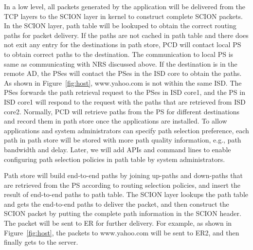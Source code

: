 In a low level, all packets generated by the application will be
delivered from the TCP layers to the SCION layer in kernel to
construct complete SCION packets. In the SCION layer, path table
will be lookuped to obtain the correct routing paths for packet
delivery. If the paths are not cached in path table and there does
not exit any entry for the destinations in path store, PCD will
contact local PS to obtain correct paths to the destination. The
communication to local PS is same as communicating with NRS
discussed above. If the destination is in the remote AD, the PSes
will contact the PSes in the ISD core to obtain the paths. As shown
in Figure~\ref{fig:host}, www.yahoo.com is not within the same ISD.
The PSes forwards the path retrieval request to the PSes in ISD
core1, and the PS in ISD core1 will respond to the request with the
paths that are retrieved from ISD core2. Normally, PCD will retrieve
paths from the PS for different destinations and record them in path
store once the applications are installed. To allow applications and
system administrators can specify path selection preference, each
path in path store will be stored with more path quality
information, e.g., path bandwidth and delay.
Later, we will add APIs and command lines to enable configuring path
selection policies in path table by system administrators.

Path store will build end-to-end paths by joining up-paths and
down-paths that are retrieved from the PS according to routing
selection policies, and insert the result of end-to-end paths to
path table. The SCION layer lookups the path table and gets the
end-to-end paths to deliver the packet, and then construct the SCION
packet by putting the complete path information in the SCION header. %
The packet will be sent to ER for further delivery. For example, as
shown in Figure~\ref{fig:host}, the packets to www.yahoo.com will be
sent to ER2, and then finally gets to the server.

